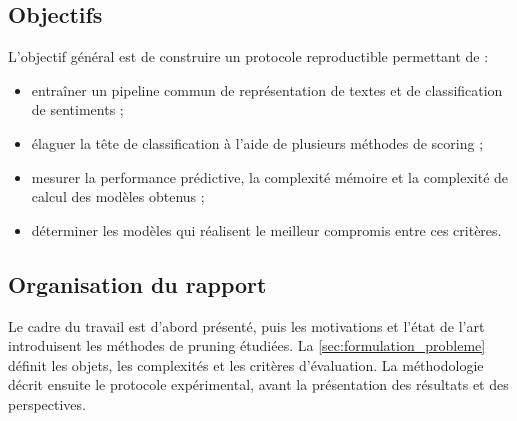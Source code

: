 \subsection{Objectifs}
\label{ssec:introduction_objectifs}

L'objectif général est de construire un protocole reproductible permettant de :
\begin{itemize}
    \item entraîner un pipeline commun de représentation de textes et de
    classification de sentiments ;
    \item élaguer la tête de classification à l'aide de plusieurs méthodes de
    scoring ;
    \item mesurer la performance prédictive, la complexité mémoire et la
    complexité de calcul des modèles obtenus ;
    \item déterminer les modèles qui réalisent le meilleur compromis entre ces
    critères.
\end{itemize}

\subsection{Organisation du rapport}
\label{ssec:introduction_organisation}

Le cadre du travail est d'abord présenté, puis les motivations et l'état de
l'art introduisent les méthodes de pruning étudiées. La
\autoref{sec:formulation_probleme} définit les objets, les complexités et les
critères d'évaluation. La méthodologie décrit ensuite le protocole expérimental,
avant la présentation des résultats et des perspectives.
